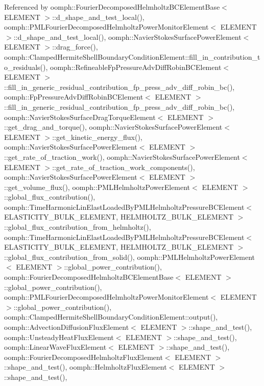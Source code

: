 Referenced by oomph\+::\+Fourier\+Decomposed\+Helmholtz\+B\+C\+Element\+Base$<$ E\+L\+E\+M\+E\+N\+T $>$\+::d\+\_\+shape\+\_\+and\+\_\+test\+\_\+local(), oomph\+::\+P\+M\+L\+Fourier\+Decomposed\+Helmholtz\+Power\+Monitor\+Element$<$ E\+L\+E\+M\+E\+N\+T $>$\+::d\+\_\+shape\+\_\+and\+\_\+test\+\_\+local(), oomph\+::\+Navier\+Stokes\+Surface\+Power\+Element$<$ E\+L\+E\+M\+E\+N\+T $>$\+::drag\+\_\+force(), oomph\+::\+Clamped\+Hermite\+Shell\+Boundary\+Condition\+Element\+::fill\+\_\+in\+\_\+contribution\+\_\+to\+\_\+residuals(), oomph\+::\+Refineable\+Fp\+Pressure\+Adv\+Diff\+Robin\+B\+C\+Element$<$ E\+L\+E\+M\+E\+N\+T $>$\+::fill\+\_\+in\+\_\+generic\+\_\+residual\+\_\+contribution\+\_\+fp\+\_\+press\+\_\+adv\+\_\+diff\+\_\+robin\+\_\+bc(), oomph\+::\+Fp\+Pressure\+Adv\+Diff\+Robin\+B\+C\+Element$<$ E\+L\+E\+M\+E\+N\+T $>$\+::fill\+\_\+in\+\_\+generic\+\_\+residual\+\_\+contribution\+\_\+fp\+\_\+press\+\_\+adv\+\_\+diff\+\_\+robin\+\_\+bc(), oomph\+::\+Navier\+Stokes\+Surface\+Drag\+Torque\+Element$<$ E\+L\+E\+M\+E\+N\+T $>$\+::get\+\_\+drag\+\_\+and\+\_\+torque(), oomph\+::\+Navier\+Stokes\+Surface\+Power\+Element$<$ E\+L\+E\+M\+E\+N\+T $>$\+::get\+\_\+kinetic\+\_\+energy\+\_\+flux(), oomph\+::\+Navier\+Stokes\+Surface\+Power\+Element$<$ E\+L\+E\+M\+E\+N\+T $>$\+::get\+\_\+rate\+\_\+of\+\_\+traction\+\_\+work(), oomph\+::\+Navier\+Stokes\+Surface\+Power\+Element$<$ E\+L\+E\+M\+E\+N\+T $>$\+::get\+\_\+rate\+\_\+of\+\_\+traction\+\_\+work\+\_\+components(), oomph\+::\+Navier\+Stokes\+Surface\+Power\+Element$<$ E\+L\+E\+M\+E\+N\+T $>$\+::get\+\_\+volume\+\_\+flux(), oomph\+::\+P\+M\+L\+Helmholtz\+Power\+Element$<$ E\+L\+E\+M\+E\+N\+T $>$\+::global\+\_\+flux\+\_\+contribution(), oomph\+::\+Time\+Harmonic\+Lin\+Elast\+Loaded\+By\+P\+M\+L\+Helmholtz\+Pressure\+B\+C\+Element$<$ E\+L\+A\+S\+T\+I\+C\+I\+T\+Y\+\_\+\+B\+U\+L\+K\+\_\+\+E\+L\+E\+M\+E\+N\+T, H\+E\+L\+M\+H\+O\+L\+T\+Z\+\_\+\+B\+U\+L\+K\+\_\+\+E\+L\+E\+M\+E\+N\+T $>$\+::global\+\_\+flux\+\_\+contribution\+\_\+from\+\_\+helmholtz(), oomph\+::\+Time\+Harmonic\+Lin\+Elast\+Loaded\+By\+P\+M\+L\+Helmholtz\+Pressure\+B\+C\+Element$<$ E\+L\+A\+S\+T\+I\+C\+I\+T\+Y\+\_\+\+B\+U\+L\+K\+\_\+\+E\+L\+E\+M\+E\+N\+T, H\+E\+L\+M\+H\+O\+L\+T\+Z\+\_\+\+B\+U\+L\+K\+\_\+\+E\+L\+E\+M\+E\+N\+T $>$\+::global\+\_\+flux\+\_\+contribution\+\_\+from\+\_\+solid(), oomph\+::\+P\+M\+L\+Helmholtz\+Power\+Element$<$ E\+L\+E\+M\+E\+N\+T $>$\+::global\+\_\+power\+\_\+contribution(), oomph\+::\+Fourier\+Decomposed\+Helmholtz\+B\+C\+Element\+Base$<$ E\+L\+E\+M\+E\+N\+T $>$\+::global\+\_\+power\+\_\+contribution(), oomph\+::\+P\+M\+L\+Fourier\+Decomposed\+Helmholtz\+Power\+Monitor\+Element$<$ E\+L\+E\+M\+E\+N\+T $>$\+::global\+\_\+power\+\_\+contribution(), oomph\+::\+Clamped\+Hermite\+Shell\+Boundary\+Condition\+Element\+::output(), oomph\+::\+Advection\+Diffusion\+Flux\+Element$<$ E\+L\+E\+M\+E\+N\+T $>$\+::shape\+\_\+and\+\_\+test(), oomph\+::\+Unsteady\+Heat\+Flux\+Element$<$ E\+L\+E\+M\+E\+N\+T $>$\+::shape\+\_\+and\+\_\+test(), oomph\+::\+Linear\+Wave\+Flux\+Element$<$ E\+L\+E\+M\+E\+N\+T $>$\+::shape\+\_\+and\+\_\+test(), oomph\+::\+Fourier\+Decomposed\+Helmholtz\+Flux\+Element$<$ E\+L\+E\+M\+E\+N\+T $>$\+::shape\+\_\+and\+\_\+test(), oomph\+::\+Helmholtz\+Flux\+Element$<$ E\+L\+E\+M\+E\+N\+T $>$\+::shape\+\_\+and\+\_\+test(), 